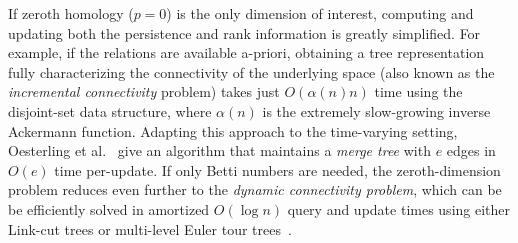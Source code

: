 \documentclass[sn-mathphys]{sn-jnl}
\begin{document}
If  zeroth homology ($p = 0$) is the only dimension of interest, computing and updating both the persistence and rank information  is greatly simplified. For example, if the relations are available a-priori, obtaining a tree representation fully characterizing the connectivity of the underlying space (also known as the \emph{incremental connectivity} problem) takes just $O(\alpha(n) n)$ time using the disjoint-set data structure, where $\alpha(n)$ is the extremely slow-growing inverse Ackermann function. 
Adapting this approach to the time-varying setting, Oesterling et al.~\cite{oesterling2015computing} give an algorithm that maintains a \emph{merge tree} with $e$ edges in $O(e)$ time per-update.
If only Betti numbers are needed, the zeroth-dimension problem reduces even further to the \emph{dynamic connectivity problem}, which can be be efficiently solved in amortized $O(\log n)$ query and update times using either Link-cut trees or multi-level Euler tour trees~\cite{kapron2013dynamic}.
  
\end{document}
